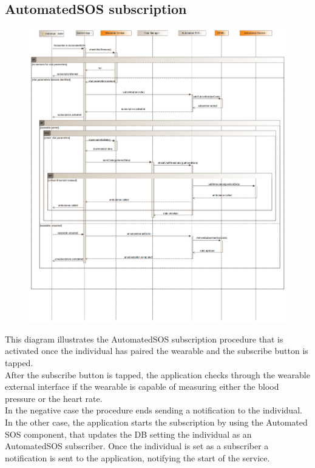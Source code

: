 \subsection{AutomatedSOS subscription}
\begin{figure}[H]
\centering
\includegraphics[width=\linewidth]{resources/uml/sequence/AutomatedSOS.png}
\end{figure}
This diagram illustrates the AutomatedSOS subscription procedure that is activated once the individual has paired the wearable and the subscribe button is tapped.\\
After the subscribe button is tapped, the application checks through the wearable external interface if the wearable is capable of measuring either the blood pressure or the heart rate.\\
In the negative case the procedure ends sending a notification to the individual.
In the other case, the application starts the subscription by using the Automated SOS component, that updates the DB setting the individual as an AutomatedSOS subscriber. Once the individual is set as a subscriber a notification is sent to the application, notifying the start of the service.\\
